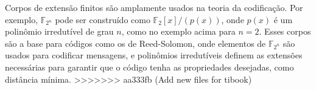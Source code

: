 
\begin{remark}
  Corpos de extensão finitos são amplamente usados na teoria da codificação.
  Por exemplo, $\mathbb{F}_{2^n}$ pode ser construído como $\mathbb{F}_2[x] / (p(x))$,
  onde $p(x)$ é um polinômio irredutível de grau $n$, como no exemplo
  acima para $n = 2$. Esses corpos são a base para códigos como os de
  Reed-Solomon, onde elementos de $\mathbb{F}_{2^n}$ são usados para codificar
  mensagens, e polinômios irredutíveis definem as extensões necessárias para
  garantir que o código tenha as propriedades desejadas, como distância mínima.
>>>>>>> aa333fb (Add new files for tibook)
\end{remark}
